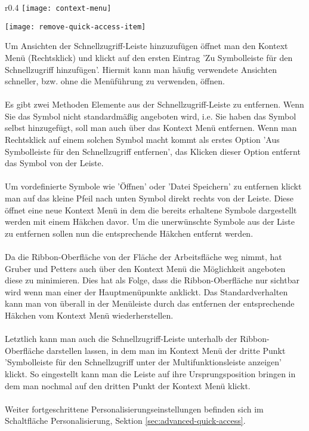 \begin{wrapfigure}{r}{0.4\textwidth}
	\vspace{-4pt}
	\texttt{[image: context-menu]}
	\vspace{-5pt}
	\caption{Kontext Menü}
	\label{fig:context-menu}
	\vspace{50pt}
	\texttt{[image: remove-quick-access-item]}
	\vspace{-5pt}
	\caption{Vordefinierte Symbole\newline Entfernen}
	\label{fig:remove-quick-access-item}
	\vspace{4pt}
\end{wrapfigure}

\noindent
Um Ansichten der Schnellzugriff-Leiste hinzuzufügen öffnet man den Kontext Menü (Rechtsklick) und klickt auf den ersten Eintrag 'Zu Symbolleiste für den Schnellzugriff hinzufügen'. Hiermit kann man häufig verwendete Ansichten schneller, bzw. ohne die Menüführung zu verwenden, öffnen.\\
\\
Es gibt zwei Methoden Elemente aus der Schnellzugriff-Leiste zu entfernen. Wenn Sie das Symbol nicht standardmäßig angeboten wird, i.e. Sie haben das Symbol selbst hinzugefügt, soll man auch über das Kontext Menü entfernen. Wenn man Rechtsklick auf einem solchen Symbol macht kommt als erstes Option 'Aus Symbolleiste für den Schnellzugriff entfernen', das Klicken dieser Option entfernt das Symbol von der Leiste.\\
\\
Um vordefinierte Symbole wie 'Öffnen' oder 'Datei Speichern' zu entfernen klickt man auf das kleine Pfeil nach unten Symbol direkt rechts von der Leiste. Diese öffnet eine neue Kontext Menü in dem die bereits erhaltene Symbole dargestellt werden mit einem Häkchen davor. Um die unerwünschte Symbole aus der Liste zu entfernen sollen nun die entsprechende Häkchen entfernt werden.\\
\\
Da die Ribbon-Oberfläche von der Fläche der Arbeitsfläche weg nimmt, hat Gruber und Petters auch über den Kontext Menü die Möglichkeit angeboten diese zu minimieren. Dies hat als Folge, dass die Ribbon-Oberfläche nur sichtbar wird wenn man einer der Hauptmenüpunkte anklickt. Das Standardverhalten kann man von überall in der Menüleiste durch das entfernen der entsprechende Häkchen vom Kontext Menü wiederherstellen.\\
\\
Letztlich kann man auch die Schnellzugriff-Leiste unterhalb der Ribbon-Oberfläche darstellen lassen, in dem man im Kontext Menü der dritte Punkt 'Symbolleiste für den Schnellzugriff unter der Multifunktionsleiste anzeigen' klickt. So eingestellt kann man die Leiste auf ihre Ursprungsposition bringen in dem man nochmal auf den dritten Punkt der Kontext Menü klickt.\\
\\
Weiter fortgeschrittene Personalisierungseinstellungen befinden sich im Schaltfläche Personalisierung, Sektion \ref{sec:advanced-quick-access}.

